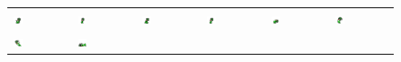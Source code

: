 \documentclass[book.tex]{subfiles}
\begin{document}
\begin{figure}[H]
\centering
 \begin{table}[H]
  \begin{tabularx}{\textwidth}[c]{|XXXXXX|}
  \hline
  \includegraphics[width=0.17\textwidth]{screenshots_300dpi/game/sprite1a.png} &
  \includegraphics[width=0.17\textwidth]{screenshots_300dpi/game/sprite1b.png} &
  \includegraphics[width=0.17\textwidth]{screenshots_300dpi/game/sprite1c.png} &
  \includegraphics[width=0.17\textwidth]{screenshots_300dpi/game/sprite1d.png} &
  \includegraphics[width=0.17\textwidth]{screenshots_300dpi/game/sprite1e.png} &
  \includegraphics[width=0.17\textwidth]{screenshots_300dpi/game/sprite1f.png} \\  
  \includegraphics[width=0.17\textwidth]{screenshots_300dpi/game/sprite1g.png} & 
  \includegraphics[width=0.17\textwidth]{screenshots_300dpi/game/sprite1h.png} &

\end{tabularx}
\end{table}
\end{figure}
\end{document}
